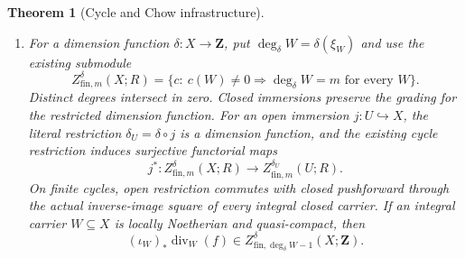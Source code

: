 \documentclass[11pt]{article}
\newtheorem{theorem}{Theorem}[section]
\theoremstyle{definition}
\theoremstyle{remark}
\begin{document}
\begin{theorem}[Cycle and Chow infrastructure]
\begin{enumerate}[label=\textup{(\roman*)},leftmargin=*]
\item
For a dimension function \(\delta:X\to\mathbf Z\), put
\(\deg_\delta W=\delta(\xi_W)\) and use the existing submodule
\[
 Z^\delta_{\mathrm{fin},m}(X;R)
 =\{c:\ c(W)\ne0\Longrightarrow\deg_\delta W=m
                  \text{ for every }W\}.
\]
Distinct degrees intersect in zero. Closed immersions preserve the
grading for the restricted dimension function.
For an open immersion \(j:U\hookrightarrow X\), the literal
restriction \(\delta_U=\delta\circ j\) is a dimension function, and
the existing cycle restriction induces surjective functorial maps
\[
 j^*:Z^\delta_{\mathrm{fin},m}(X;R)
       \longrightarrow Z^{\delta_U}_{\mathrm{fin},m}(U;R).
\]
On finite cycles, open restriction commutes with closed pushforward
through the actual inverse-image square of every integral closed carrier.
If an integral carrier \(W\subseteq X\) is locally Noetherian and
quasi-compact, then
\[
  (\iota_W)_*\operatorname{div}_W(f)
       \in Z^\delta_{\mathrm{fin},\deg_\delta W-1}(X;\mathbf Z).
\]


\end{enumerate}
\end{theorem}
\end{document}
